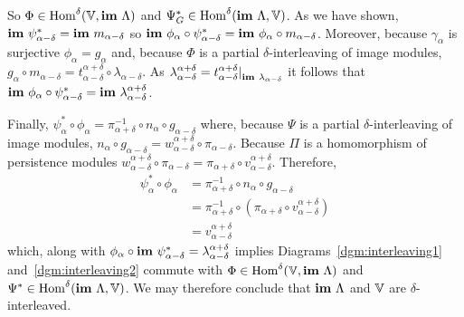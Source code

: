   So $\Phi\in\mathrm{Hom}^\delta(\mathbb{V},\mathbf{im}~\Lambda)$ and $\Psi_G^*\in\mathrm{Hom}^\delta(\mathbf{im}~\Lambda,\mathbb{V})$.
  As we have shown, $\mathbf{im}~\psi_{\alpha-\delta}^* = \mathbf{im}~m_{\alpha-\delta}$ so $\mathbf{im}~\phi_\alpha\circ\psi_{\alpha-\delta}^* = \mathbf{im}~\phi_\alpha\circ m_{\alpha-\delta}$.
  Moreover, because $\gamma_\alpha$ is surjective $\phi_\alpha = g_\alpha$ and, because $\Phi$ is a partial $\delta$-interleaving of image modules, $g_\alpha\circ m_{\alpha-\delta} = t_{\alpha-\delta}^{\alpha+\delta}\circ \lambda_{\alpha-\delta}$.
  As $\lambda_{\alpha-\delta}^{\alpha+\delta} = t_{\alpha-\delta}^{\alpha+\delta}\mathord{\mid}_{\mathbf{im}~\lambda_{\alpha-\delta}}$ it follows that $\mathbf{im}~\phi_\alpha\circ\psi_{\alpha-\delta}^* = \mathbf{im}~\lambda_{\alpha-\delta}^{\alpha+\delta}$.

  Finally, $\psi_\alpha^*\circ\phi_\alpha = \pi_{\alpha+\delta}^{-1}\circ n_\alpha\circ g_{\alpha-\delta}$ where, because $\Psi$ is a partial $\delta$-interleaving of image modules, $n_\alpha\circ g_{\alpha-\delta} = w_{\alpha-\delta}^{\alpha+\delta}\circ\pi_{\alpha-\delta}$.
  Because $\Pi$ is a homomorphism of persistence modules $w_{\alpha-\delta}^{\alpha+\delta}\circ \pi_{\alpha-\delta} = \pi_{\alpha+\delta}\circ v_{\alpha-\delta}^{\alpha+\delta}$.
  Therefore,
  \begin{align*}
    \psi_\alpha^*\circ\phi_\alpha &= \pi_{\alpha+\delta}^{-1}\circ n_\alpha\circ g_{\alpha-\delta}\\
      &= \pi_{\alpha+\delta}^{-1}\circ (\pi_{\alpha+\delta}\circ v_{\alpha-\delta}^{\alpha+\delta})\\
      &= v_{\alpha-\delta}^{\alpha+\delta}
  \end{align*}
  which, along with $\phi_\alpha\circ\mathbf{im}~\psi_{\alpha-\delta}^* = \lambda_{\alpha-\delta}^{\alpha+\delta}$ implies Diagrams~\ref{dgm:interleaving1} and~\ref{dgm:interleaving2} commute with $\Phi\in\mathrm{Hom}^\delta(\mathbb{V},\mathbf{im}~\Lambda)$ and $\Psi^*\in\mathrm{Hom}^\delta(\mathbf{im}~\Lambda, \mathbb{V})$.
  We may therefore conclude that $\mathbf{im}~\Lambda$ and $\mathbb{V}$ are $\delta$-interleaved.
\endproofatend
